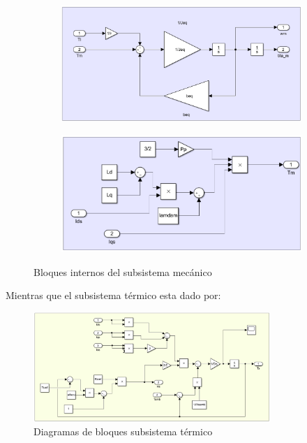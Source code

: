 \documentclass{article}
\begin{document}
\begin{figure}[H]
    \centering
    \begin{subfigure}[b]{0.45\textwidth}
        \centering
        \includegraphics[width=1\textwidth]{sub_mecanico2.png}
    \end{subfigure}
    \begin{subfigure}[b]{0.45\textwidth}
        \centering
        \includegraphics[width=1\textwidth]{sub_mecanico3.png}
    \end{subfigure}
    \caption{Bloques internos del subsistema mecánico}
\end{figure}

Mientras que el subsistema térmico esta dado por:

\begin{figure}[H]
    \centering
    \includegraphics[width=0.8\textwidth]{sub_termico.png}
    \caption{Diagramas de bloques subsistema térmico}
\end{figure}
\end{document}
